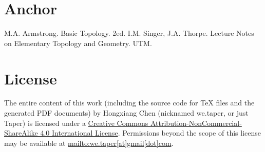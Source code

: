 \documentclass{article}
\begin{document}
\section{Anchor}
\label{sec:Anchor}

\begin{thebibliography}{1}
     M.A. Armstrong. Basic Topology. 2ed.
     I.M. Singer, J.A. Thorpe. Lecture Notes on
    Elementary Topology and Geometry. UTM.
\end{thebibliography}
\printnomenclature
\section{License}
The entire content of this work (including the source code
for TeX files and the generated PDF documents) by 
Hongxiang Chen (nicknamed we.taper, or just Taper) is
licensed under a 
\href{http://creativecommons.org/licenses/by-nc-sa/4.0/}{Creative 
Commons Attribution-NonCommercial-ShareAlike 4.0 International 
License}. Permissions beyond the scope of this 
license may be available at \url{mailto:we.taper[at]gmail[dot]com}.
\end{document}
